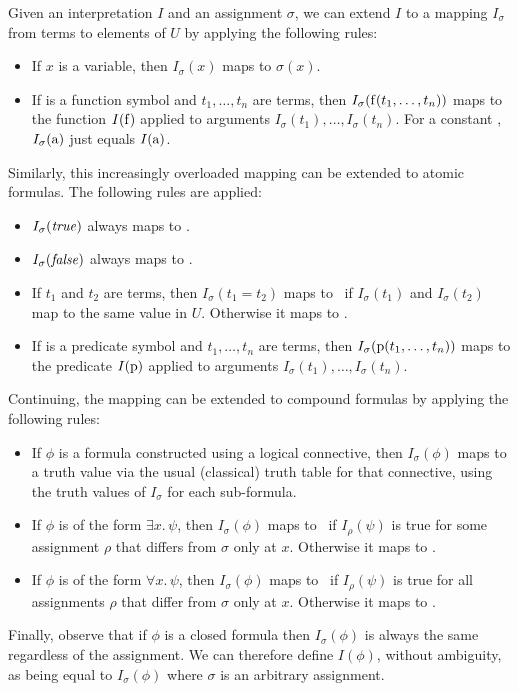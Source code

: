 Given an interpretation $I$ and an assignment $\sigma$,
we can extend $I$ to a mapping $I_\sigma$
from terms to elements of $U$
by applying the following rules:
\begin{itemize}
\item
If $x$ is a variable, then $I_\sigma(x)$ maps to $\sigma(x)$.
\item
If  is a function symbol and $t_1, \ldots, t_n$ are terms,
then $I_\sigma(\operatorname{f}(t_1, \ldots, t_n))$ maps to
the function $I(\operatorname{f})$ applied to arguments
$I_\sigma(t_1), \ldots, I_\sigma(t_n)$.
For a constant , $I_\sigma(\operatorname{a})$ just equals $I(\operatorname{a})$.
\end{itemize}
Similarly,
this increasingly overloaded mapping
can be extended to atomic formulas.
The following rules are applied:
\begin{itemize}
\item
$I_\sigma(\text{\textit{true}})$ always maps to \true.
\item
$I_\sigma(\text{\textit{false}})$ always maps to \false.
\item
If $t_1$ and $t_2$ are terms,
then $I_\sigma(t_1 = t_2)$ maps to \true\ if
$I_\sigma(t_1)$ and $I_\sigma(t_2)$ map to the same value in $U$.
Otherwise it maps to \false.
\item
If  is a predicate symbol and $t_1, \ldots, t_n$ are terms,
then $I_\sigma(\operatorname{p}(t_1, \ldots, t_n))$ maps to
the predicate $I(\operatorname{p})$ applied to arguments
$I_\sigma(t_1), \ldots, I_\sigma(t_n)$.
\end{itemize}
Continuing,
the mapping can be extended to compound formulas
by applying the following rules:
\begin{itemize}
\item
If $\phi$ is a formula constructed using a logical connective,
then $I_\sigma(\phi)$ maps to a truth value
via the usual (classical) truth table for that connective,
using the truth values of $I_\sigma$ for each sub-formula.
\item
If $\phi$ is of the form $\exists x.\, \psi$,
then $I_\sigma(\phi)$ maps to \true\ if $I_\rho(\psi)$ is true
for some assignment $\rho$ that differs from $\sigma$ only at $x$.
Otherwise it maps to \false.
\item
If $\phi$ is of the form $\forall x.\, \psi$,
then $I_\sigma(\phi)$ maps to \true\ if $I_\rho(\psi)$ is true
for all assignments $\rho$ that differ from $\sigma$ only at $x$.
Otherwise it maps to \false.
\end{itemize}
Finally, observe that if $\phi$ is a closed formula
then $I_\sigma(\phi)$ is always the same
regardless of the assignment.
We can therefore define $I(\phi)$,
without ambiguity,
as being equal to $I_\sigma(\phi)$
where $\sigma$ is an arbitrary assignment.

